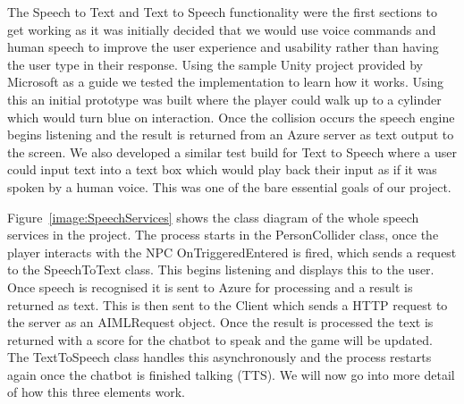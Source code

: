 \par
\medskip

The Speech to Text and Text to Speech functionality were the first sections to get working as it was initially decided that we would use voice commands and human speech to improve the user experience and usability rather than having the user type in their response. Using the sample Unity project provided by Microsoft as a guide we tested the implementation to learn how it works. Using this an initial prototype was built where the player could walk up to a cylinder which would turn blue on interaction. Once the collision occurs the speech engine begins listening and the result is returned from an Azure server as text output to the screen. We also developed a similar test build for Text to Speech where a user could input text into a text box which would play back their input as if it was spoken by a human voice. This was one of the bare essential goals of our project.

\par
\medskip

Figure~\ref{image:SpeechServices} shows the class diagram of the whole speech services in the project. The process starts in the PersonCollider class, once the player interacts with the NPC OnTriggeredEntered is fired, which sends a request to the SpeechToText class. This begins listening and displays this to the user. Once speech is recognised it is sent to Azure for processing and a result is returned as text. This is then sent to the Client which sends a HTTP request to the server as an AIMLRequest object. Once the result is processed the text is returned with a score for the chatbot to speak and the game will be updated. The TextToSpeech class handles this asynchronously and the process restarts again once the chatbot is finished talking (TTS). We will now go into more detail of how this three elements work.

